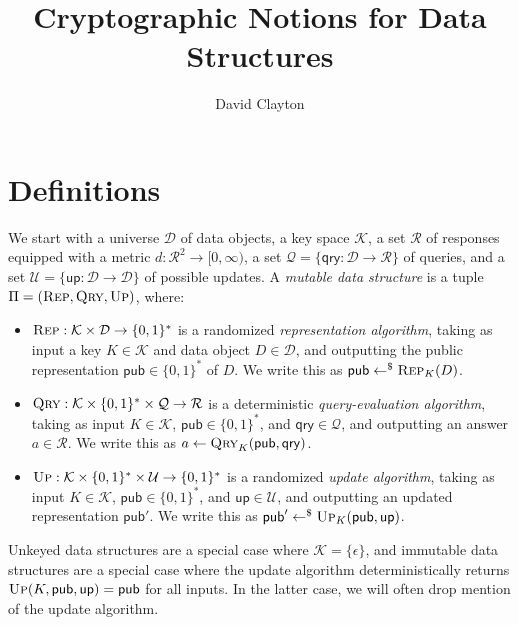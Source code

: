 \documentclass[11pt, pdftex]{article}
\title{Cryptographic Notions for Data Structures}
\author{David Clayton}
\newcommand{\key}{K}
\begin{document}
\maketitle

\section{Definitions}

We start with a universe $\mathcal{D}$ of data objects, a key space $\mathcal{K}$, a set $\mathcal{R}$ of responses equipped with a metric $d: \mathcal{R}^2 \to [0,\infty)$, a set $\mathcal{Q} = \{\mathsf{qry}: \mathcal{D} \to \mathcal{R}\}$ of queries, and a set $\mathcal{U} = \{\mathsf{up}: \mathcal{D} \to \mathcal{D}\}$ of possible updates. A {\em mutable data structure} is a tuple $\Pi = (\textsc{Rep},\textsc{Qry},\textsc{Up})$, where:

\begin{itemize}
  \item $\textsc{Rep}: \mathcal{K} \times \mathcal{D} \to \{0,1\}^*$ is a randomized {\em representation algorithm}, taking as input a key $K \in \mathcal{K}$ and data object $D \in \mathcal{D}$, and outputting the public representation $\mathsf{pub} \in \{0,1\}^*$ of $D$. We write this as $\mathsf{pub} \gets^\$ \textsc{Rep}_K(D)$.
  \item $\textsc{Qry}: \mathcal{K} \times \{0,1\}^* \times \mathcal{Q} \to \mathcal{R}$ is a deterministic {\em query-evaluation algorithm}, taking as input $K \in \mathcal{K}$, $\mathsf{pub} \in \{0,1\}^*$, and $\mathsf{qry} \in \mathcal{Q}$, and outputting an answer $a \in \mathcal{R}$. We write this as $a \gets \textsc{Qry}_K(\mathsf{pub},\mathsf{qry})$.
  \item $\textsc{Up}: \mathcal{K} \times \{0,1\}^* \times \mathcal{U} \to \{0,1\}^*$ is a randomized {\em update algorithm}, taking as input $K \in \mathcal{K}$, $\mathsf{pub} \in \{0,1\}^*$, and $\mathsf{up} \in \mathcal{U}$, and outputting an updated representation $\mathsf{pub}'$. We write this as $\mathsf{pub}' \gets^\$ \textsc{Up}_K(\mathsf{pub},\mathsf{up})$.
\end{itemize}

Unkeyed data structures are a special case where $\mathcal{K} = \{\epsilon\}$, and immutable data structures are a special case where the update algorithm deterministically returns $\textsc{Up}(\key,\mathsf{pub},\mathsf{up})=\mathsf{pub}$ for all inputs.  In the latter case, we will often drop mention of the update algorithm.
\end{document}
